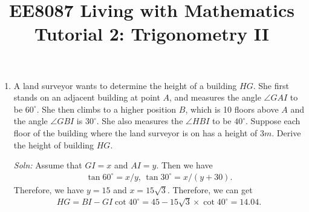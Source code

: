 \documentclass{article}
\title{EE8087 Living with Mathematics\\Tutorial 2: Trigonometry II}
\date{}
\begin{document}
 \maketitle
\begin{enumerate}
\item   A land surveyor wants to determine the height of a building $HG$. She first stands on an adjacent building at point $A$, and measures the angle $\angle GAI$ to be $60^\circ$. She then climbs to a higher position $B$, which is 10 floors above $A$ and the angle $\angle GBI$ is $30^\circ$. She also measures the $\angle HBI$ to be $40^\circ$. Suppose each floor of the building where the land surveyor is on has a height of $3m$. Derive the height of building $HG$.
  \begin{figure}[h]
    \centering
  \end{figure}
  
\emph{Soln:} Assume that $GI = x$ and $AI= y$. Then we have
\begin{align*}
 \tan 60^\circ = x/y,\, \tan 30^\circ = x/(y+30). 
\end{align*}
Therefore, we have $y = 15$ and $x = 15\sqrt{3}$. Therefore, we can get
\begin{align*}
  HG = BI - GI\cot 40^\circ  = 45 - 15\sqrt{3}\times \cot 40^\circ = 14.04.
\end{align*}

  \newpage


\end{enumerate}
\end{document}
